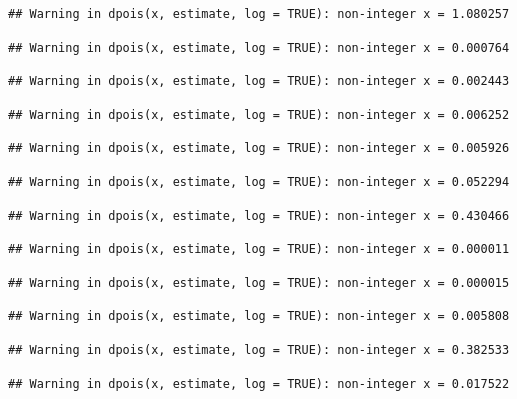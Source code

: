 \documentclass[]{article}
\begin{document}
\begin{verbatim}
## Warning in dpois(x, estimate, log = TRUE): non-integer x = 1.080257
\end{verbatim}

\begin{verbatim}
## Warning in dpois(x, estimate, log = TRUE): non-integer x = 0.000764
\end{verbatim}

\begin{verbatim}
## Warning in dpois(x, estimate, log = TRUE): non-integer x = 0.002443
\end{verbatim}

\begin{verbatim}
## Warning in dpois(x, estimate, log = TRUE): non-integer x = 0.006252
\end{verbatim}

\begin{verbatim}
## Warning in dpois(x, estimate, log = TRUE): non-integer x = 0.005926
\end{verbatim}

\begin{verbatim}
## Warning in dpois(x, estimate, log = TRUE): non-integer x = 0.052294
\end{verbatim}

\begin{verbatim}
## Warning in dpois(x, estimate, log = TRUE): non-integer x = 0.430466
\end{verbatim}

\begin{verbatim}
## Warning in dpois(x, estimate, log = TRUE): non-integer x = 0.000011
\end{verbatim}

\begin{verbatim}
## Warning in dpois(x, estimate, log = TRUE): non-integer x = 0.000015
\end{verbatim}

\begin{verbatim}
## Warning in dpois(x, estimate, log = TRUE): non-integer x = 0.005808
\end{verbatim}

\begin{verbatim}
## Warning in dpois(x, estimate, log = TRUE): non-integer x = 0.382533
\end{verbatim}

\begin{verbatim}
## Warning in dpois(x, estimate, log = TRUE): non-integer x = 0.017522
\end{verbatim}
\end{document}
